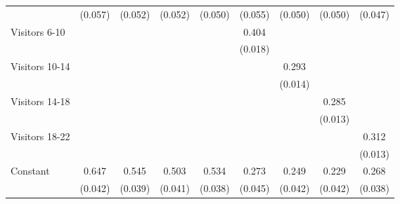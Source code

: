 {\begin{tabular}{l*{8}{c}}
                    &     (0.057)         &     (0.052)         &     (0.052)         &     (0.050)         &     (0.055)         &     (0.050)         &     (0.050)         &     (0.047)         \\
Visitors 6-10       &                     &                     &                     &                     &       0.404\sym{***}&                     &                     &                     \\
                    &                     &                     &                     &                     &     (0.018)         &                     &                     &                     \\
Visitors 10-14      &                     &                     &                     &                     &                     &       0.293\sym{***}&                     &                     \\
                    &                     &                     &                     &                     &                     &     (0.014)         &                     &                     \\
Visitors 14-18      &                     &                     &                     &                     &                     &                     &       0.285\sym{***}&                     \\
                    &                     &                     &                     &                     &                     &                     &     (0.013)         &                     \\
Visitors 18-22      &                     &                     &                     &                     &                     &                     &                     &       0.312\sym{***}\\
                    &                     &                     &                     &                     &                     &                     &                     &     (0.013)         \\
Constant            &       0.647\sym{***}&       0.545\sym{***}&       0.503\sym{***}&       0.534\sym{***}&       0.273\sym{***}&       0.249\sym{***}&       0.229\sym{***}&       0.268\sym{***}\\
                    &     (0.042)         &     (0.039)         &     (0.041)         &     (0.038)         &     (0.045)         &     (0.042)         &     (0.042)         &     (0.038)         \\

\end{tabular}}
